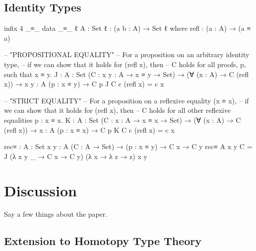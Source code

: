 \documentclass[12pt]{article}
\begin{document}
\subsection*{Identity Types}
\begin{center}
\begin{minipage}{0.9\textwidth}
\begin{code}
infix  4  _≡_
data _≡_ {ℓ} {A : Set ℓ} : (a b : A) → Set ℓ where
  refl : (a : A) → (a ≡ a)

-- "PROPOSITIONAL EQUALITY"
-- For a proposition on an arbitrary identity type,
-- if we can show that it holds for (refl x), then
-- C holds for all proofs, p, such that x ≡ y.
J : {A : Set} (C : {x y : A} → x ≡ y → Set) →
    (∀ (x : A) → C (refl x)) →
    {x y : A} (p : x ≡ y) → C p
J C c (refl x) = c x

-- "STRICT EQUALITY"
-- For a proposition on a reflexive equality (x ≡ x),
-- if we can show that it holds for (refl x), then
-- C holds for all other reflexive equalities p : x ≡ x.
K : {A : Set} (C : {x : A} → x ≡ x → Set) →
    (∀ (x : A) → C (refl x)) →
    {x : A} (p : x ≡ x) → C p
K C c (refl x) = c x

rec≡ : {A : Set} {x y : A} (C : A → Set) →
       (p : x ≡ y) → C x → C y
rec≡ {A} {x} {y} C = 
  J (λ {x} {y} _ → C x → C y)
    (λ x → λ z → z)
    {x} {y} 
\end{code}
\end{minipage}
\end{center}

\section{Discussion}
Say a few things about the paper.

\subsection*{Extension to Homotopy Type Theory}
\end{document}
